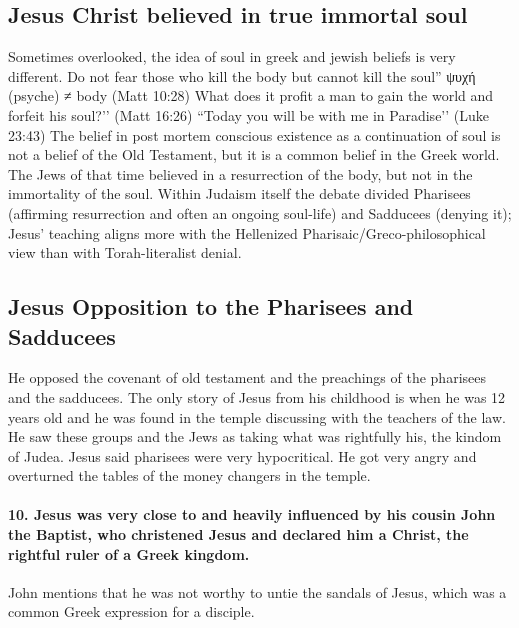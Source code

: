 \subsection{Jesus Christ believed in true immortal soul}\label{subsec:jesus-christ-believed-in-true-immortal-soul}
Sometimes overlooked, the idea of soul in greek and jewish beliefs is very different.
Do not fear those who kill the body but cannot kill the soul'' ψυχή (psyche) ≠ body (Matt 10:28) What does it profit a man to gain the world and forfeit his soul?’’ (Matt 16:26) ``Today you will be with me in Paradise’’ (Luke 23:43)
The belief in post mortem conscious existence as a continuation of soul is not a belief of the Old Testament, but it is a common belief in the Greek world.
The Jews of that time believed in a resurrection of the body, but not in the immortality of the soul.
Within Judaism itself the debate divided Pharisees (affirming resurrection and often an ongoing soul-life) and Sadducees (denying it); Jesus’ teaching aligns more with the Hellenized Pharisaic/Greco-philosophical view than with Torah-literalist denial.

\subsection{Jesus Opposition to the Pharisees and Sadducees}\label{subsec:jesus-opposition-to-the-pharisees-and-sadducees}
He opposed the covenant of old testament and the preachings of the pharisees and the sadducees.
The only story of Jesus from his childhood is when he was 12 years old and he was found in the temple discussing with the teachers of the law.
He saw these groups and the Jews as taking what was rightfully his, the kindom of Judea.
Jesus said pharisees were very hypocritical.
He got very angry and overturned the tables of the money changers in the temple.


\paragraph{10.
Jesus was very close to and heavily influenced by his cousin John the Baptist, who christened Jesus and declared him a Christ, the rightful ruler of a Greek kingdom.}\label{par:jesus-was-very-close-to-and-heavily-influenced-by-his-cousin-john-the-baptist-who-christened-jesus-and-declared-him-a-christ-the-rightful-ruler-of-a-greek-kingdom.}

John mentions that he was not worthy to untie the sandals of Jesus, which was a common Greek expression for a disciple.

